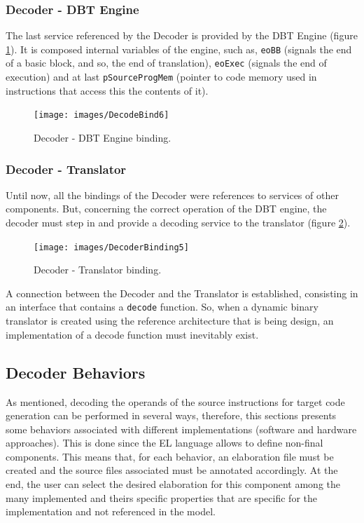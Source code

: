 \documentclass[12pt]{article}
\begin{document}
{    
\subsubsection*{Decoder - DBT Engine}   
    The last service referenced by the Decoder is provided by the DBT Engine (figure \ref{fig:DecoderBind6}). It is composed internal variables of the engine, such as, \texttt{eoBB} (signals the end of a basic block, and so, the end of translation), \texttt{eoExec} (signals the end of execution) and at last \texttt{pSourceProgMem} (pointer to code memory used in instructions that access this the contents of it).
    
	\begin{figure}[!htb]
    \centerline{
    \texttt{[image: images/DecodeBind6]}
    }
    \caption{Decoder - DBT Engine binding.}
    \label{fig:DecoderBind6} 
    \end{figure}
    

\subsubsection*{Decoder - Translator}

	Until now, all the bindings of the Decoder were references to services of other components. But, concerning the correct operation of the DBT engine, the decoder must step in and provide a decoding service to the translator (figure \ref{fig:DecoderBind5}).
    
	\begin{figure}[!htb]
    \centerline{
    \texttt{[image: images/DecoderBinding5]}
    }
    \caption{Decoder - Translator binding.}
    \label{fig:DecoderBind5} 
    \end{figure}
    
    A connection between the Decoder and the Translator is established, consisting in an interface that contains a \texttt{decode} function. So, when a dynamic binary translator is created using the reference architecture that is being design, an implementation of a decode function must inevitably exist.

\subsection{Decoder Behaviors}

As mentioned, decoding the operands of the source instructions for target code generation can be performed in several ways, therefore, this sections presents some behaviors associated with different implementations (software and hardware approaches). This is done since the EL language allows to define non-final components. This means that, for each behavior, an elaboration file must be created and the source files associated must be annotated accordingly. At the end, the user can select the desired elaboration for this component among the many implemented and theirs specific properties that are specific for the implementation and not referenced in the model.


}
\end{document}

